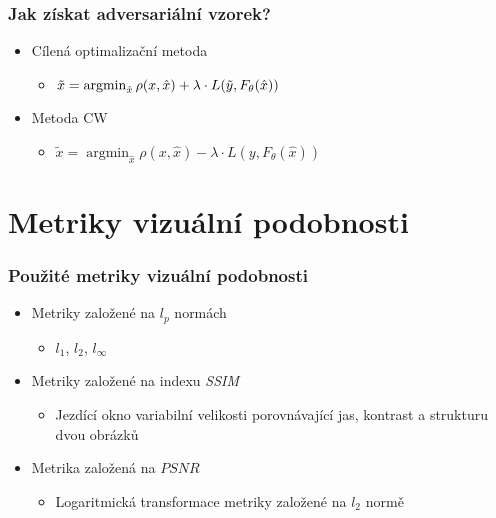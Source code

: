 \documentclass[czech]{beamer}
\begin{document}

\begin{frame}
    \frametitle{Jak získat adversariální vzorek?}
    \begin{itemize}
        \item Cílená optimalizační metoda
        \begin{itemize}
            \item $\tilde{x} = \operatornamewithlimits{argmin}_{\hat{x}} \rho(x, \hat{x}) + \lambda \cdot L(\tilde{y}, F_{\theta}(\hat{x}))$
        \end{itemize}
        \item Metoda CW
        \begin{itemize}
            \item $\tilde{x} = \operatorname{argmin}_{\hat{x}} \rho(x, \hat{x}) - \lambda \cdot L(y, F_{\theta}(\hat{x}))$
        \end{itemize}
    \end{itemize}
\end{frame}

\section{Metriky vizuální podobnosti}

\begin{frame}
    \frametitle{Použité metriky vizuální podobnosti}
    \begin{itemize}
        \item Metriky založené na $l_p$ normách
        \begin{itemize}
            \item $l_1$, $l_2$, $l_\infty$
        \end{itemize}
        \item Metriky založené na indexu \emph{SSIM}
        \begin{itemize}
            \item Jezdící okno variabilní velikosti porovnávající jas, kontrast a strukturu dvou obrázků
        \end{itemize}
        \item Metrika založená na $PSNR$
        \begin{itemize}
            \item Logaritmická transformace metriky založené na $l_2$ normě
        \end{itemize}
    \end{itemize}
\end{frame}
\end{document}
